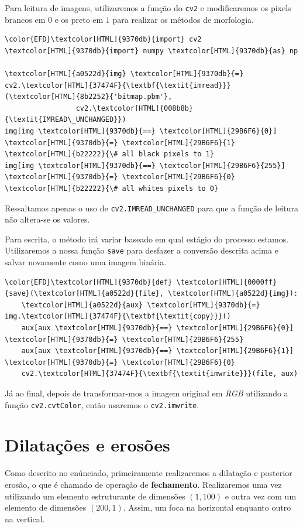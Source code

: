 \documentclass[twocolumn, 10pt]{article}
\begin{document}
Para leitura de imagens, utilizaremos a função do \texttt{cv2} e modificaremos os pixels brancos em \(0\) e os preto em \(1\) para realizar os métodos de morfologia.
\begin{Code}
\begin{Verbatim}
\color{EFD}\textcolor[HTML]{9370db}{import} cv2
\textcolor[HTML]{9370db}{import} numpy \textcolor[HTML]{9370db}{as} np

\textcolor[HTML]{a0522d}{img} \textcolor[HTML]{9370db}{=} cv2.\textcolor[HTML]{37474F}{\textbf{\textit{imread}}}(\textcolor[HTML]{8b2252}{'bitmap.pbm'},
                 cv2.\textcolor[HTML]{008b8b}{\textit{IMREAD\_UNCHANGED}})
img[img \textcolor[HTML]{9370db}{==} \textcolor[HTML]{29B6F6}{0}] \textcolor[HTML]{9370db}{=} \textcolor[HTML]{29B6F6}{1}   \textcolor[HTML]{b22222}{\# all black pixels to 1}
img[img \textcolor[HTML]{9370db}{==} \textcolor[HTML]{29B6F6}{255}] \textcolor[HTML]{9370db}{=} \textcolor[HTML]{29B6F6}{0} \textcolor[HTML]{b22222}{\# all whites pixels to 0}
\end{Verbatim}
\end{Code}
Ressaltamos apenas o uso de \texttt{cv2.IMREAD\_UNCHANGED} para que a função de leitura não altera-se os valores.

Para escrita, o método irá variar baseado em qual estágio do processo estamos. Utilizaremos a nossa função \texttt{save} para desfazer a conversão descrita acima e salvar novamente como uma imagem binária.
\begin{Code}
\begin{Verbatim}
\color{EFD}\textcolor[HTML]{9370db}{def} \textcolor[HTML]{0000ff}{save}(\textcolor[HTML]{a0522d}{file}, \textcolor[HTML]{a0522d}{img}):
    \textcolor[HTML]{a0522d}{aux} \textcolor[HTML]{9370db}{=} img.\textcolor[HTML]{37474F}{\textbf{\textit{copy}}}()
    aux[aux \textcolor[HTML]{9370db}{==} \textcolor[HTML]{29B6F6}{0}] \textcolor[HTML]{9370db}{=} \textcolor[HTML]{29B6F6}{255}
    aux[aux \textcolor[HTML]{9370db}{==} \textcolor[HTML]{29B6F6}{1}] \textcolor[HTML]{9370db}{=} \textcolor[HTML]{29B6F6}{0}
    cv2.\textcolor[HTML]{37474F}{\textbf{\textit{imwrite}}}(file, aux)
\end{Verbatim}
\end{Code}

Já ao final, depois de transformar-mos a imagem original em \emph{RGB} utilizando a função
\texttt{cv2.cvtColor}, então usaremos o \texttt{cv2.imwrite}.

\section*{Dilatações e erosões}
\label{sec:org11ed8b4}
Como descrito no enúnciado, primeiramente realizaremos a dilatação e posterior erosão, o que é chamado de operação de \textbf{fechamento}. Realizaremos uma vez utilizando um elemento estruturante de dimensões \((1,100)\) e outra vez com um elemento de dimensões \((200,1)\). Assim, um foca na horizontal enquanto outro na vertical.
\end{document}
